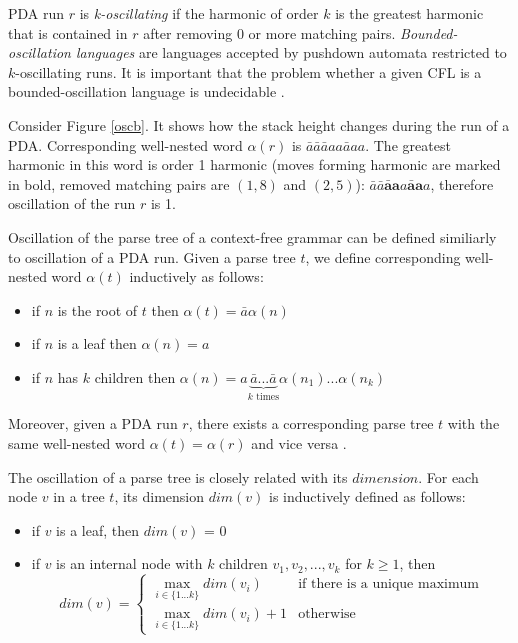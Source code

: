 PDA run $r$ is \textit{k-oscillating} if the harmonic of order $k$ is the greatest harmonic that is contained in $r$ after removing $0$ or more matching pairs. \textit{Bounded-oscillation languages} are languages accepted by pushdown automata restricted to $k$-oscillating runs. It is important that the problem whether a given CFL is a bounded-oscillation language is undecidable \cite{BoundOsc}.
\begin{example}
Consider Figure \ref{oscb}. It shows how the stack height changes during the run of a PDA. Corresponding well-nested word $\alpha(r)$ is $\bar{a}\bar{a}\bar{a}aa\bar{a}aa$. The greatest harmonic in this word is order 1 harmonic (moves forming harmonic are marked in bold, removed matching pairs are $(1, 8)$ and $(2, 5)$): $\bar{a}\bar{a}\mathbf{\bar{a}a}a\mathbf{\bar{a}a}a$, therefore oscillation of the run $r$ is 1.
\end{example}


Oscillation of the parse tree of a context-free grammar can be defined similiarly to oscillation of a PDA run. Given a parse tree $t$, we define corresponding well-nested word $\alpha(t)$ inductively as follows:
\begin{itemize}
\item if $n$ is the root of $t$ then $\alpha(t) = \bar{a}\alpha(n)$
\item if $n$ is a leaf then $\alpha(n)=a$
\item if $n$ has $k$ children then $\alpha(n) = a\underbrace{\bar{a}...\bar{a}}_\text{$k$ times}\alpha(n_1)...\alpha(n_k)$
\end{itemize}


Moreover, given a PDA run $r$, there exists a corresponding parse tree $t$ with the same well-nested word $\alpha(t)=\alpha(r)$ and vice versa \cite{BoundOsc}.


The oscillation of a parse tree is closely related with its $dimension$. For each node $v$ in a tree $t$, its dimension $dim(v)$ is inductively defined as follows:
\begin{itemize}
\item if $v$ is a leaf, then $dim(v)$ = 0
\item if $v$ is an internal node with $k$ children $v_1, v_2, ..., v_k$ for $k \ge 1$, then 
$$
dim(v) = 
 \begin{cases}
   \max_{i \in \{1...k\}}dim(v_i) &\text{if there is a unique maximum}\\
   \max_{i \in \{1...k\}}dim(v_i)+1 &\text{otherwise}
 \end{cases}
$$
\end{itemize}


